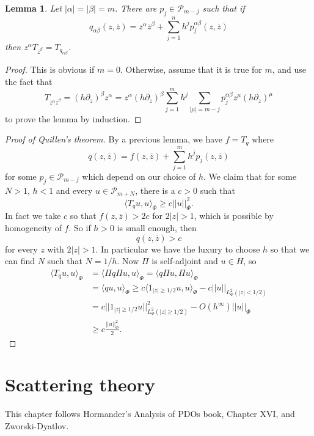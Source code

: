 \documentclass[12pt]{report}
\newtheorem{lemma}[theorem]{Lemma}
\theoremstyle{definition}
\begin{document}
\begin{lemma}
    Let $|\alpha| = |\beta| = m$. There are $p_j \in \mathcal P_{m - j}$ such that if
    $$q_{\alpha\beta}(z, \overline z) = z^\alpha \overline z^\beta + \sum_{j=1}^n h^j p_j^{\alpha\beta}(z, \overline z)$$
    then $z^\alpha T_{\overline z^\beta} = T_{q_{\alpha\beta}}$.
\end{lemma}
\begin{proof}
    This is obvious if $m = 0$. Otherwise, assume that it is true for $m$, and use the fact that
    $$T_{z^\alpha \overline z^\beta} = (h \partial_z)^\beta z^\alpha = z^\alpha(h\partial_z)^\beta \sum_{j=1}^m h^j \sum_{|\mu|=m-j} p_j^{\alpha\beta} z^\mu (h\partial_z)^\mu$$
    to prove the lemma by induction.
\end{proof}
\begin{proof}[Proof of Quillen's theorem]
    By a previous lemma, we have $f = T_q$ where
    $$q(z, \overline z) = f(z, \overline z) + \sum_{j=1}^m h^j p_j(z, \overline z)$$
    for some $p_j \in \mathcal P_{m - j}$ which depend on our choice of $h$. We claim that for some $N > 1$, $h < 1$ and every $u \in \mathcal P_{m + N}$, there is a $c > 0$ such that
    $$\langle T_qu, u\rangle_\Phi \geq c||u||^2_\Phi.$$
    In fact we take $c$ so that $f(z, \overline z) > 2c$ for $2|z| > 1$, which is possible by homogeneity of $f$. So if $h > 0$ is small enough, then
    $$q(z, \overline z) > c$$
    for every $z$ with $2|z| > 1$. In particular we have the luxury to choose $h$ so that we can find $N$ such that $N = 1/h$. Now $\Pi$ is self-adjoint and $u \in H$, so
\begin{align*}
    \langle T_qu, u\rangle_\Phi &= \langle \Pi q\Pi u, u\rangle_\Phi = \langle q\Pi u, \Pi u\rangle_\Phi \\
    &= \langle qu, u\rangle_\Phi \geq c\langle 1_{|z| \geq 1/2}u, u\rangle_\Phi - c||u||_{L^2_\Phi(|z| < 1/2)}\\
    &= c||1_{|z| \geq 1/2} u||_{L^2_\Phi(|z| \geq 1/2)}^2 - O(h^\infty)||u||_\Phi\\
    &\geq c\frac{||u||_\Phi^2}{2}.
\end{align*} 
\end{proof}



\chapter{Scattering theory}
This chapter follows Hormander's Analysis of PDOs book, Chapter XVI, and Zworski-Dyatlov.
\end{document}
